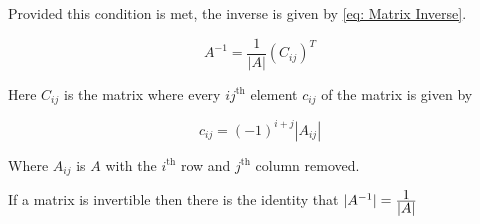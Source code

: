 \documentclass[main.tex]{subfiles}
\begin{document}
                    Provided this condition is met, the inverse is given by \eqref{eq: Matrix Inverse}.

                    \begin{equation}
                        A^{-1} = \frac{1}{|A|}\left(C_{ij}\right)^T
                        \label{eq: Matrix Inverse}
                    \end{equation}

                    Here $C_{ij}$ is the matrix where every $ij^{\text{th}}$ element $c_{ij}$ of the matrix is given by

                    \begin{equation}
                        c_{ij} = (-1)^{i+j}|A_{ij}|
                    \end{equation}

                    Where $A_{ij}$ is $A$ with the $i^{\text{th}}$ row and $j^{\text{th}}$ column removed.

                    If a matrix is invertible then there is the identity that $|A^{-1}| = \frac{\displaystyle 1}{\displaystyle |A|}$


                    
\end{document}
